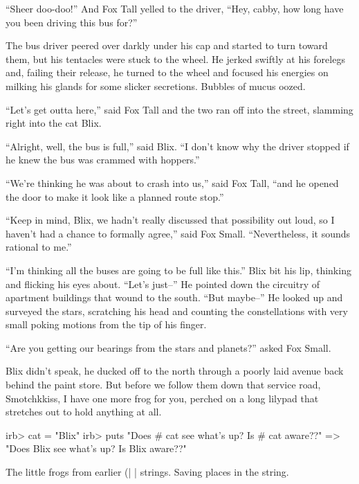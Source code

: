 \documentclass[12pt,twoside]{report}
\begin{document}
``Sheer doo-doo!''  And Fox Tall yelled to the driver, ``Hey, cabby,
how long have you been driving this bus for?''

The bus driver peered over darkly under his cap and started to turn
toward them, but his tentacles were stuck to the wheel.  He jerked
swiftly at his forelegs and, failing their release, he turned to the
wheel and focused his energies on milking his glands for some slicker
secretions.  Bubbles of mucus oozed.

``Let's get outta here,'' said Fox Tall and the two ran off into the
street, slamming right into the cat Blix.

``Alright, well, the bus is full,'' said Blix.  ``I don't know why the
driver stopped if he knew the bus was crammed with hoppers.''

``We're thinking he was about to crash into us,'' said Fox Tall, ``and
he opened the door to make it look like a planned route stop.''

``Keep in mind, Blix, we hadn't really discussed that possibility out
loud, so I haven't had a chance to formally agree,'' said Fox Small.
``Nevertheless, it sounds rational to me.''

``I'm thinking all the buses are going to be full like this.''  Blix
bit his lip, thinking and flicking his eyes about.  ``Let's just--''
He pointed down the circuitry of apartment buildings that wound to the
south.  ``But maybe--'' He looked up and surveyed the stars,
scratching his head and counting the constellations with very small
poking motions from the tip of his finger.

``Are you getting our bearings from the stars and planets?'' asked Fox
Small.

Blix didn't speak, he ducked off to the north through a poorly laid
avenue back behind the paint store. But before we follow them down
that service road, Smotchkkiss, I have one more frog for you, perched
on a long lilypad that stretches out to hold anything at all.


\begin{consolecode}

 irb> cat = "Blix"
 irb> puts "Does #{ cat } see what's up?  Is #{ cat } aware??"
   => "Does Blix see what's up?  Is Blix aware??"

\end{consolecode}


The little frogs from earlier (\rubyinline|%
\rubyinline|%
strings.  Saving places in the string.
\end{document}
